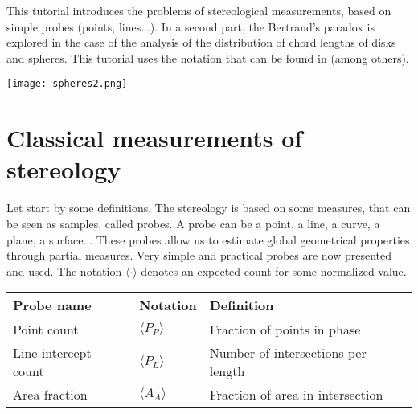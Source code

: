 \def\difficulty{3}

\begin{note}This tutorial introduces the problems of  stereological measurements, based on simple probes (points, lines...). In a second part, the Bertrand's paradox is explored in the case of the analysis of the distribution of chord lengths of disks and spheres. This tutorial uses the notation that can be found in \cite{Russ2000} (among others).
\end{note} %
\vspace*{-10pt}
\begin{center}
{\texttt{[image: spheres2.png]}}
\end{center}\vspace*{-10pt}
\section{Classical measurements of stereology}\vspace*{-5pt}
Let start by some definitions. The stereology is based on some measures, that can be seen as samples, called probes. A probe can be a point, a line, a curve, a plane, a surface...
These probes allow us to estimate global geometrical properties through partial measures. Very simple and practical probes are now presented and used. The notation $\langle\cdot\rangle$ denotes an expected count for some normalized value.

\begin{center}
\begin{tabular}{|l|l|l|}
\hline
Probe name & Notation & Definition\\ 
\hline
Point count & $\langle P_P\rangle$ & Fraction of points in phase\\ \hline
Line intercept count & $\langle P_L\rangle$ & Number of intersections per length\\ \hline
Area fraction & $\langle A_A\rangle$ & Fraction of area in intersection\\
\hline
\end{tabular}
\end{center}

